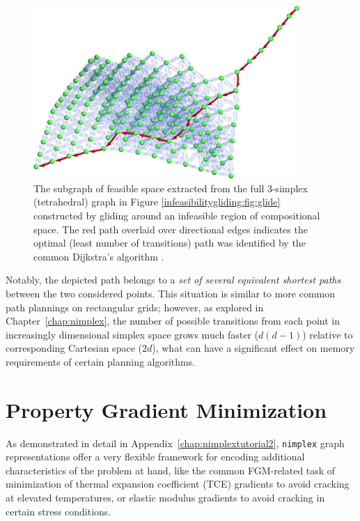 \begin{figure}[H]
    \centering
    \includegraphics[width=0.9\textwidth]{pathplanning/InfeasibilityGliding_Feasible.jpeg}
    \caption{The subgraph of feasible space extracted from the full 3-simplex (tetrahedral) graph in Figure \ref{infeasibilitygliding:fig:glide} constructed by gliding around an infeasible region of compositional space. The red path overlaid over directional edges indicates the optimal (least number of transitions) path was identified by the common Dijkstra's algorithm \cite{Dijkstra1959AGraphs}.}
    \label{pathplan:fig:shortestpath}
\end{figure}

Notably, the depicted path belongs to a \emph{set of several equivalent shortest paths} between the two considered points. This situation is similar to more common path plannings on rectangular grids; however, as explored in Chapter~\ref{chap:nimplex}, the number of possible transitions from each point in increasingly dimensional simplex space grows much faster ($d(d-1)$) relative to corresponding Cartesian space ($2d$), what can have a significant effect on memory requirements of certain planning algorithms.

\section{Property Gradient Minimization} \label{pathplan:sec:gradientmin}

As demonstrated in detail in Appendix~\ref{chap:nimplextutorial2}, \texttt{nimplex} graph representations offer a very flexible framework for encoding additional characteristics of the problem at hand, like the common FGM-related task of minimization of thermal expansion coefficient (TCE) gradients \cite{Kirk2021ComputationalMonotonicity} to avoid cracking at elevated temperatures, or elastic modulus gradients to avoid cracking in certain stress conditions.



